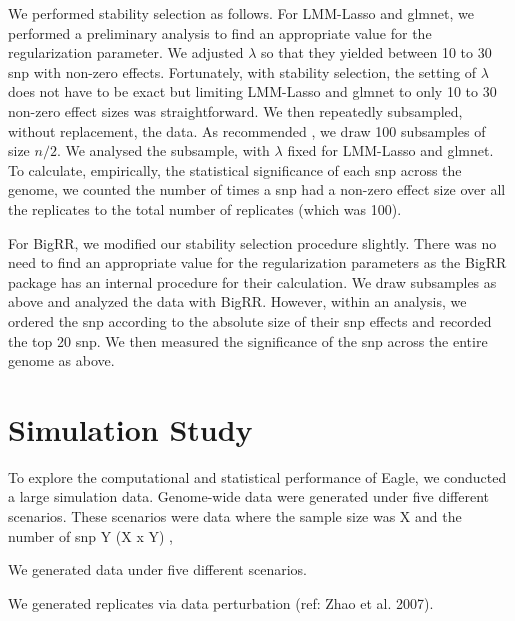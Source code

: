 \documentclass{nature}
\begin{document}
We performed stability selection as follows. For LMM-Lasso and glmnet, we performed a preliminary analysis to find an 
appropriate value for the regularization parameter.  We adjusted $\lambda$ so that they yielded 
between 10 to 30 snp with non-zero effects. Fortunately, with stability selection, the setting of $\lambda$ does not have to be exact 
but limiting LMM-Lasso and glmnet to only 10 to 30 non-zero effect sizes was straightforward. We then repeatedly subsampled, 
without replacement, the data. As recommended \cite{meinshausen2010stability}, we draw 100 subsamples of size $n/2$. We 
analysed the subsample, with $\lambda$ fixed for LMM-Lasso and glmnet.  To calculate, empirically,  the statistical significance of each 
snp across the genome, we counted the number of times a snp had a non-zero effect size over all the replicates to the total 
number of replicates (which was 100). 


For BigRR, we modified our stability selection procedure slightly. 
There was no need to find an appropriate value for the regularization 
parameters as the BigRR package has an internal procedure for their 
calculation. We draw subsamples as above and analyzed the data with BigRR. However, within an analysis, we ordered 
the snp according to the absolute size of their snp effects and recorded the top 20 snp. We then measured the significance 
of the snp across the entire genome as above. 


\cite{meinshausen2010stability}


\section{Simulation Study}

To explore the computational and statistical performance of Eagle, we conducted a large simulation data.  Genome-wide data 
were generated under five different scenarios. These scenarios were data where the sample size was X and the number of snp Y (X x Y) ,

We generated data under five different scenarios. 


We generated 
replicates via data perturbation (ref: Zhao et al. 2007).
\end{document}
